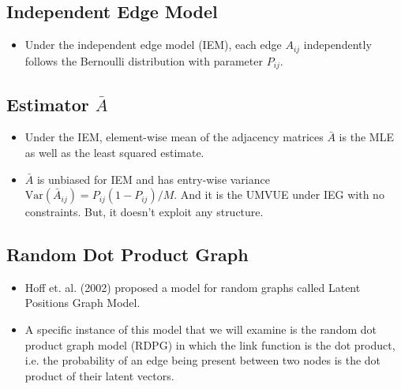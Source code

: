 \documentclass[a4paper]{article}
\begin{document}

\subsection{Independent Edge Model}
\begin{itemize}
\item Under the independent edge model (IEM), each edge $A_{ij}$ independently follows the Bernoulli distribution with parameter $P_{ij}$.
\end{itemize}

\subsection{Estimator $\bar{A}$}
\begin{itemize}
\item Under the IEM, element-wise mean of the adjacency matrices $\bar{A}$ is the MLE as well as the least squared estimate.
\item $\bar{A}$ is unbiased for IEM and has entry-wise variance $\mathrm{Var}(\bar{A}_{ij}) = P_{ij} (1-P_{ij})/M$. And it is the UMVUE under IEG with no constraints. But, it doesn't exploit any structure. 
\end{itemize}

\subsection{Random Dot Product Graph}
\begin{itemize}
\item Hoff et. al. (2002) proposed a model for random graphs called Latent Positions Graph Model.
\item A specific instance of this model that we will examine is the random dot product graph model (RDPG) in which the link function is the dot product, i.e. the probability of an edge being present between two nodes is the dot product of their latent vectors.
\end{itemize}
\end{document}
